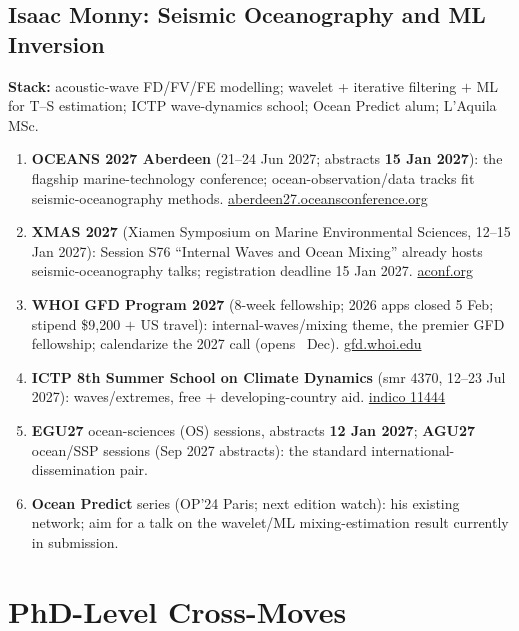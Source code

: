 \documentclass[11pt,a4paper]{article}
\begin{document}
\subsection{Isaac Monny: Seismic Oceanography and ML Inversion}
\textbf{Stack:} acoustic-wave FD/FV/FE modelling; wavelet + iterative filtering $+$ ML for T--S estimation; ICTP wave-dynamics school; Ocean Predict alum; L'Aquila MSc.
\begin{enumerate}[leftmargin=1.6em]
  \item \textbf{OCEANS 2027 Aberdeen} (21--24 Jun 2027; abstracts \textbf{15 Jan 2027}): the flagship marine-technology conference; ocean-observation/data tracks fit seismic-oceanography methods. \href{https://aberdeen27.oceansconference.org/2027-call-for-abstracts/}{aberdeen27.oceansconference.org}
  \item \textbf{XMAS 2027} (Xiamen Symposium on Marine Environmental Sciences, 12--15 Jan 2027): Session S76 ``Internal Waves and Ocean Mixing'' already hosts seismic-oceanography talks; registration deadline 15 Jan 2027. \href{https://www.aconf.org/conf_228283/contribution/507.html}{aconf.org}
  \item \textbf{WHOI GFD Program 2027} (8-week fellowship; 2026 apps closed 5 Feb; stipend \$9{,}200 $+$ US travel): internal-waves/mixing theme, the premier GFD fellowship; calendarize the 2027 call (opens ~Dec). \href{https://gfd.whoi.edu/}{gfd.whoi.edu}
  \item \textbf{ICTP 8th Summer School on Climate Dynamics} (smr 4370, 12--23 Jul 2027): waves/extremes, free $+$ developing-country aid. \href{https://indico.ictp.it/event/11444/overview}{indico 11444}
  \item \textbf{EGU27} ocean-sciences (OS) sessions, abstracts \textbf{12 Jan 2027}; \textbf{AGU27} ocean/SSP sessions (Sep 2027 abstracts): the standard international-dissemination pair.
  \item \textbf{Ocean Predict} series (OP'24 Paris; next edition watch): his existing network; aim for a talk on the wavelet/ML mixing-estimation result currently in submission.
\end{enumerate}

\section{PhD-Level Cross-Moves}
\end{document}
